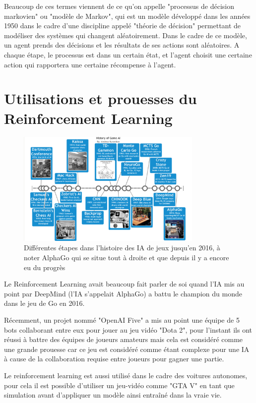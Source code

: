 \documentclass[a4paper,10pt,openany,oneside]{report}
\begin{document}
Beaucoup de ces termes viennent de ce qu'on appelle "processus de décision markovien" ou "modèle de Markov", qui est un modèle développé dans les années 1950 dans le cadre d'une discipline appelé "théorie de décision" permettant de modéliser des systèmes qui changent aléatoirement. Dans le cadre de ce modèle, un agent prends des décisions et les résultats de ses actions sont aléatoires. A chaque étape, le processus est dans un certain état, et l'agent choisit une certaine action qui rapportera une certaine récompense à l'agent.

\section{Utilisations et prouesses du Reinforcement Learning}
\begin{figure}[H]
	\centering
	\includegraphics[width=0.8\textwidth]{img/histoire.png}
	\caption{Différentes étapes dans l'histoire des IA de jeux jusqu'en 2016, à noter AlphaGo qui se situe tout à droite et que depuis il y a encore eu du progrès \cite[]{andreykurenkov}}
\end{figure}
Le Reinforcement Learning avait beaucoup fait parler de soi quand l'IA mis au point par DeepMind (l'IA s'appelait AlphaGo) a battu le champion du monde dans le jeu de Go en 2016.

Récemment, un projet nommé "OpenAI Five" a mis au point une équipe de 5 bots collaborant entre eux pour jouer au jeu vidéo "Dota 2", pour l'instant ils ont réussi à battre des équipes de joueurs amateurs mais cela est considéré comme une grande prouesse car ce jeu est considéré comme étant complexe pour une IA à cause de la collaboration requise entre joueurs pour gagner une partie.

Le reinforcement learning est aussi utilisé dans le cadre des voitures autonomes, pour cela il est possible d'utiliser un jeu-vidéo comme "GTA V" en tant que simulation avant d'appliquer un modèle ainsi entraîné dans la vraie vie.
\end{document}

